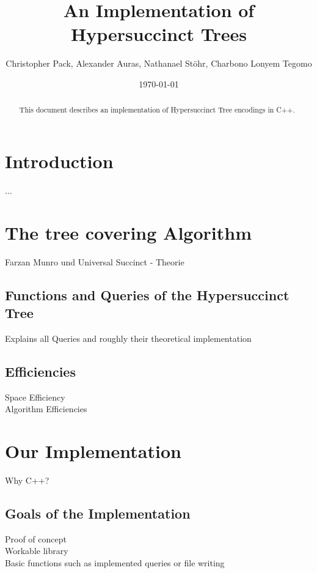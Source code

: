 \documentclass{article}
\begin{document}
\title{An Implementation of Hypersuccinct Trees}
\author{Christopher Pack, Alexander Auras, Nathanael Stöhr, Charbono Lonyem Tegomo}
\date{\today}
\maketitle

\begin{abstract}
This document describes an implementation of Hypersuccinct Tree encodings in C++.

\end{abstract}

\tableofcontents

\section{Introduction}
...

\section{The tree covering Algorithm}
Farzan Munro und Universal Succinct - Theorie

\subsection{Functions and Queries of the Hypersuccinct Tree}
Explains all Queries and roughly their theoretical implementation \cite{farzanMunro} \cite{universalSuccinct}

\subsection{Efficiencies}
Space Efficiency\\
Algorithm Efficiencies

\section{Our Implementation}
Why C++?

\subsection{Goals of the Implementation}
Proof of concept\\
Workable library\\
Basic functions such as implemented queries or file writing
\end{document}
